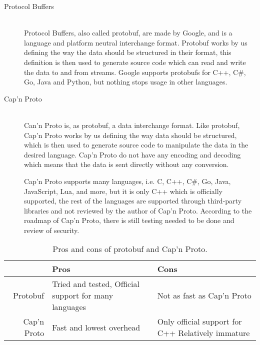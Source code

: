 \begin{description}

    \item[Protocol Buffers] \hfill\\
Protocol Buffers, also called protobuf, are made by Google, and is a language and platform neutral interchange format.
Protobuf works by us defining the way the data should be structured in their format, this definition is then used to generate source code which can read and write the data to and from streams.\cite{protobuf}
Google supports protobufs for C++, C\#, Go, Java and Python, but nothing stops usage in other languages\cite{protobuf}.

\item[Cap'n Proto] \hfill\\
Can'n Proto is, as protobuf, a data interchange format.
Like protobuf, Cap'n Proto works by us defining the way data should be structured, which is then used to generate source code to manipulate the data in the desired language\cite{capnproto_schema}.
Cap'n Proto do not have any encoding and decoding which means that the data is sent directly without any conversion\cite{capnproto}.

Cap'n Proto supports many languages, i.e. C, C++, C\#, Go, Java, JavaScript, Lua, and more,
but it is only C++ which is officially supported,
the rest of the languages are supported through third-party libraries and not reviewed by the author of Cap'n Proto\cite{capnproto_langs}.
According to the roadmap of Cap'n Proto, there is still testing needed to be done and review of security\cite{capnproto_roadmap}.
\end{description}

\begin{table}
    \setlength{\tabcolsep}{10pt}
    \centering
    \begin{tabularx}{\textwidth}{rXX}\toprule
                    & Pros                              & Cons \\\midrule
        Protobuf    & Tried and tested, \newline Official support for many languages & Not as fast as Cap'n Proto \\
        Cap'n Proto & Fast and lowest overhead          & Only official support for C++ \newline Relatively immature\\\bottomrule
    \end{tabularx}
    \caption{Pros and cons of protobuf and Cap'n Proto.}\label{tab:format_pros_cons}
\end{table}

